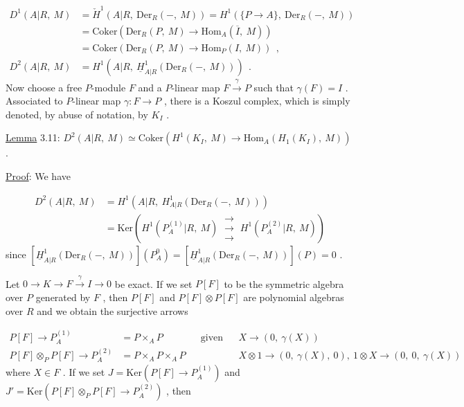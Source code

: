 \begin{equation*}
\begin{aligned}
D^1(A|R,\ M) &= \check{H}^1(A|R,\ \mathrm{Der}_R(-,\ M)) = H^1(\{P \to A\},\ \mathrm{Der}_R(-,\ M)) \\
&= \mathrm{Coker}(\mathrm{Der}_R(P,\ M) \to \mathrm{Hom}_A(\overline{I},\ M)) \\
&= \mathrm{Coker}(\mathrm{Der}_R(P,\ M) \to \mathrm{Hom}_P(I,\ M)) \ \ , \\
D^2(A|R,\ M) &= H^1(A|R,\ \underline{H}^1_{A|R}(\mathrm{Der}_R(-,\ M))) \ \ .
\end{aligned}
\end{equation*}
Now choose a free $P$-module  $F$  and a $P$-linear map  $F \xrightarrow{\ \gamma\ } P$  such that  $\gamma(F) = I$  . Associated to $P$-linear map  $\gamma : F \to P$  , there is a Koszul complex, which is simply denoted, by abuse of notation, by  $K_I$  .


\underline{Lemma} 3.11:   $D^2(A|R,\ M) \simeq \mathrm{Coker}(H^1(K_I,\ M) \to \mathrm{Hom}_A(H_1(K_I),\ M))$ .

\underline{Proof}:  We have

\begin{equation*}
\begin{aligned}
D^2(A|R,\ M) &= H^1(A|R,\ H^1_{A|R}(\mathrm{Der}_R(-,\ M))) \\
&= \mathrm{Ker}(H^1(P_A^{(1)}|R,\ M) \ \mathrel{\substack{\to\\ \to\\ \to}} \ H^1(P_A^{(2)}|R,\ M))
\end{aligned}
\end{equation*}
since  $[\underline{H}^1_{A|R}(\mathrm{Der}_R(-,\ M))](P_A^0) = [\underline{H}^1_{A|R}(\mathrm{Der}_R(-,\ M))](P) = 0$  .

Let  $0 \to K \to F \xrightarrow{\ \gamma\ } I \to 0$  be exact. If we set  $P[F]$  to be the symmetric algebra over  $P$  generated by  $F$  , then  $P[F]$  and  $P[F]\otimes P[F]$  are polynomial algebras over  $R$  and we obtain the surjective arrows

\begin{equation*}
\begin{aligned}
P[F] \to P_A^{(1)} &= P\times_A P &&\text{given by} && X \to (0,\ \gamma(X)) \\
P[F]\otimes_P P[F] \to P_A^{(2)} &= P\times_A P\times_A P && && X\otimes 1 \to (0,\ \gamma(X),\ 0),\ 1\otimes X \to (0,\ 0,\ \gamma(X))
\end{aligned}
\end{equation*}
where  $X \in F$  . If we set  $J = \mathrm{Ker}(P[F] \to P_A^{(1)})$ and
$J' = \mathrm{Ker}(P[F]\otimes_P P[F] \to P_A^{(2)})$  , then 


